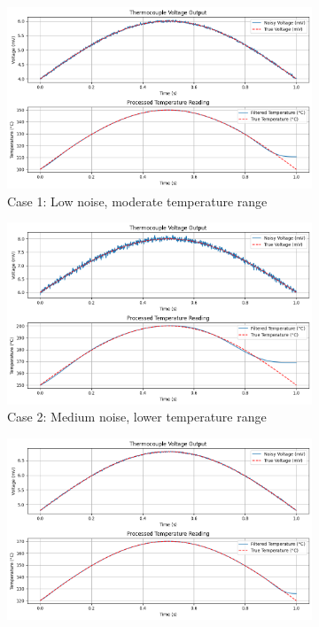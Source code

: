 \documentclass[12pt]{article}
\begin{document}
\begin{figure}[h]
    \centering
    \begin{subfigure}[b]{0.8\textwidth}
        \includegraphics[width=\textwidth]{noisy_signal1.png}
        \caption{Case 1: Low noise, moderate temperature range}
        \label{fig:case1}
    \end{subfigure}
    \begin{subfigure}[b]{0.8\textwidth}
        \includegraphics[width=\textwidth]{noisy_signal2.png}
        \caption{Case 2: Medium noise, lower temperature range}
        \label{fig:case2}
    \end{subfigure}
    \begin{subfigure}[b]{0.8\textwidth}
        \includegraphics[width=\textwidth]{noisy_signal3.png}

\end{subfigure}
\end{figure}
\end{document}
